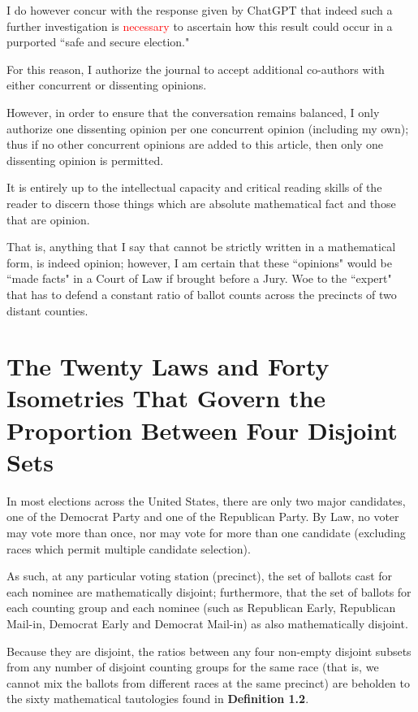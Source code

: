 I do however concur with the response given by ChatGPT that indeed such a further investigation is \textcolor{red}{necessary} to ascertain how this result could occur in a purported ``safe and secure election."

For this reason, I authorize the journal to accept additional co-authors with either concurrent or dissenting opinions.

However, in order to ensure that the conversation remains balanced, I only authorize one dissenting opinion per one concurrent opinion (including my own); thus if no other concurrent opinions are added to this article, then only one dissenting opinion is permitted.

It is entirely up to the intellectual capacity and critical reading skills of the reader to discern those things which are absolute mathematical fact and those that are opinion. 

That is, anything that I say that cannot be strictly written in a mathematical form, is indeed opinion; however, I am certain that these ``opinions" would be ``made facts" in a Court of Law if brought before a Jury. Woe to the ``expert" that has to defend a constant ratio of ballot counts across the precincts of two distant counties.

\newpage
\section{The Twenty Laws and Forty Isometries That Govern the Proportion Between Four Disjoint Sets}
In most elections across the United States, there are only two major candidates, one of the Democrat Party and one of the Republican Party. By Law, no voter may vote more than once, nor may vote for more than one candidate (excluding races which permit multiple candidate selection).

As such, at any particular voting station (precinct), the set of ballots cast for each nominee are mathematically disjoint; furthermore, that the set of ballots for each counting group and each nominee (such as Republican Early, Republican Mail-in, Democrat Early and Democrat Mail-in) as also mathematically disjoint.

Because they are disjoint, the ratios between any four non-empty disjoint subsets from any number of disjoint counting groups for the same race (that is, we cannot mix the ballots from different races at the same precinct) are beholden to the sixty mathematical tautologies found in \textbf{Definition 1.2}.

